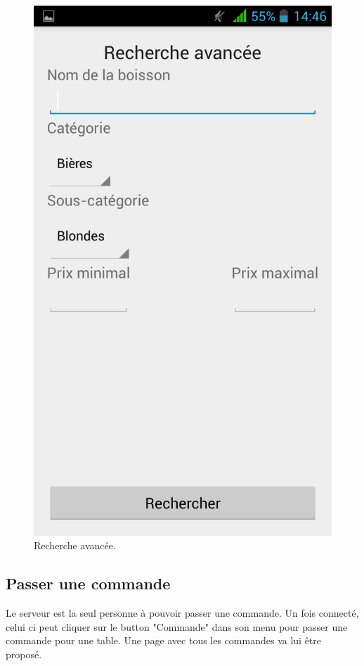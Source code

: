 \begin{figure}[H]
	\centering
	\includegraphics[scale=0.15]{img/search.png}
	\caption{Recherche avancée.}
	\label{fig:search}
\end{figure}

\subsection{Passer une commande}
Le serveur est la seul personne à pouvoir passer une commande. Un fois connecté, celui ci peut cliquer sur le button "Commande" dans son menu pour passer une commande pour une table. Une page avec tous les commandes va lui être proposé.

